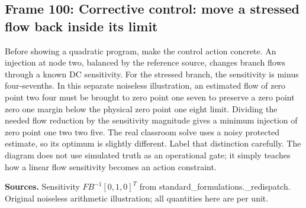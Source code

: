 \documentclass[11pt]{article}
\begin{document}
\subsection*{Frame 100: Corrective control: move a stressed flow back inside its limit}
Before showing a quadratic program, make the control action concrete. An injection at node two, balanced by the reference source, changes branch flows through a known DC sensitivity. For the stressed branch, the sensitivity is minus four-sevenths. In this separate noiseless illustration, an estimated flow of zero point two four must be brought to zero point one seven to preserve a zero point zero one margin below the physical zero point one eight limit. Dividing the needed flow reduction by the sensitivity magnitude gives a minimum injection of zero point one two two five. The real classroom solve uses a noisy protected estimate, so its optimum is slightly different. Label that distinction carefully. The diagram does not use simulated truth as an operational gate; it simply teaches how a linear flow sensitivity becomes an action constraint.\par
\par\nopagebreak\begin{minipage}{\linewidth}{\footnotesize\color{slate}\textbf{Sources.} Sensitivity $F B^{-1}[0,1,0]^T$ from standard\_formulations.\_redispatch. Original noiseless arithmetic illustration; all quantities here are per unit.\par}\end{minipage}\par\medskip
\end{document}
